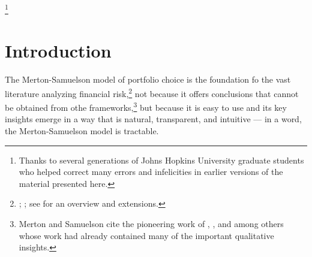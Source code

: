 \documentclass[titlepage,abstract]{\econtex}\newcommand{\texname}{ctDiscrete}
\begin{document}
\begin{authorsinfo}
\end{authorsinfo}%

\thanks{Thanks to several generations of Johns Hopkins University graduate students who helped correct many errors and infelicities in earlier versions of the material presented here.}%

\titlepagefinish%

\section{Introduction} 
The Merton-Samuelson model of portfolio choice is the foundation fo
the vast literature analyzing financial
risk,\footnote{\cite{merton:restat}; \cite{samuelson:portfolio}; see
  \cite{Sethi:Thompson:2000} for an overview and extensions.}  not
because it offers conclusions that cannot be obtained from othe
frameworks,\footnote{Merton and Samuelson cite the pioneering work of
  \cite{markowitz}, \cite{tobinRisk}, and \cite{phelpsRisk} among
  others whose work had already contained many of the important
  qualitative insights.} but because it is easy to use and its key
insights emerge in a way that is natural, transparent, and intuitive
--- in a word, the Merton-Samuelson model is tractable.
\end{document}
